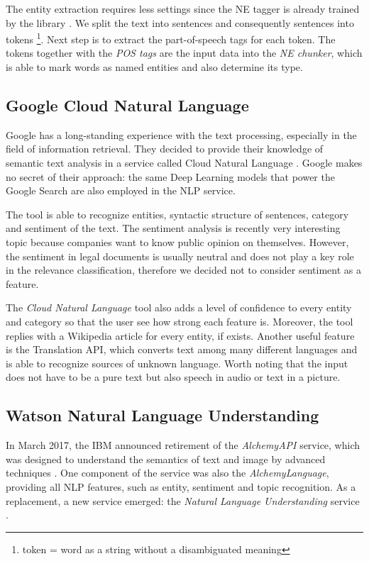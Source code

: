 \documentclass[
  digital, %
  table,   %
  lof,     %
  lot,     %
]{fithesis3}
\begin{document}
The entity extraction requires less settings since the NE tagger is already trained by the library \cite[sec. 7.5]{bird2009natural}.
We split the text into sentences and consequently sentences into tokens \footnote{token = word as a string without a disambiguated meaning}.
Next step is to extract the part-of-speech tags for each token.
The tokens together with the \textit{POS tags} are the input data into the \textit{NE chunker}, which is able to mark words as named entities and also determine its type.


\subsection{Google Cloud Natural Language}
Google has a long-standing experience with the text processing, especially in the field of information retrieval.
They decided to provide their knowledge of semantic text analysis in a service called Cloud Natural Language \cite{googleNLP}.
Google makes no secret of their approach: the same Deep Learning models that power the Google Search are also employed in the NLP service.

The tool is able to recognize entities, syntactic structure of sentences, category and sentiment  of the text.
The sentiment analysis is recently very interesting topic because companies want to know public opinion on themselves.
However, the sentiment in legal documents is usually neutral and does not play a key role in the relevance classification, therefore we decided not to consider sentiment as a feature.

The \textit{Cloud Natural Language} tool also adds a level of confidence to every entity and category so that the user see how strong each feature is. Moreover, the tool replies with a Wikipedia article for every entity, if exists. Another useful feature is the Translation API, which converts text among many different languages and is able to recognize sources of unknown language. Worth noting that the input does not have to be a pure text but also speech in audio or text in a picture.

\subsection{Watson Natural Language Understanding}
In March 2017, the IBM announced retirement of the \textit{AlchemyAPI} service, which was designed to understand the semantics of text and image by advanced techniques \cite{alchemyRetirement}.
One component of the service was also the \textit{AlchemyLanguage}, providing all NLP features, such as entity, sentiment and topic recognition.
As a replacement, a new service emerged: the \textit{Natural Language Understanding} service \cite{watsonNLP}.
\end{document}
